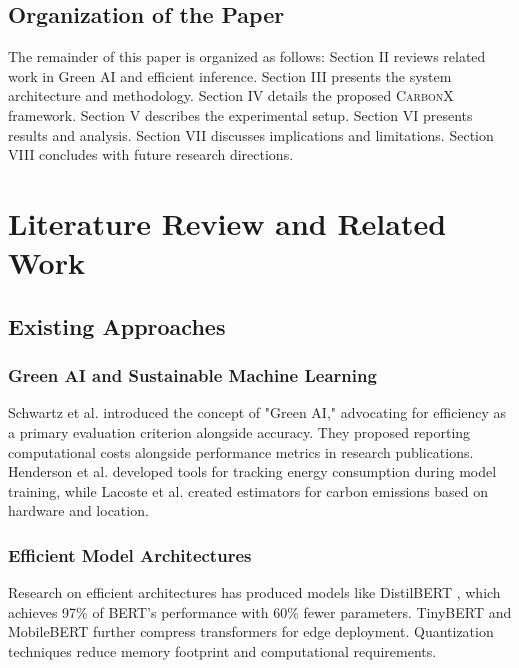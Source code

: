 \documentclass[conference]{IEEEtran}
\newcommand{\carbonx}{\textsc{CarbonX}}
\begin{document}
\subsection{Organization of the Paper}

The remainder of this paper is organized as follows: Section II reviews related work in Green AI and efficient inference. Section III presents the system architecture and methodology. Section IV details the proposed \carbonx{} framework. Section V describes the experimental setup. Section VI presents results and analysis. Section VII discusses implications and limitations. Section VIII concludes with future research directions.

\section{Literature Review and Related Work}

\subsection{Existing Approaches}

\subsubsection{Green AI and Sustainable Machine Learning}

Schwartz et al. \cite{schwartz2020green} introduced the concept of "Green AI," advocating for efficiency as a primary evaluation criterion alongside accuracy. They proposed reporting computational costs alongside performance metrics in research publications. Henderson et al. \cite{henderson2020towards} developed tools for tracking energy consumption during model training, while Lacoste et al. \cite{lacoste2019quantifying} created estimators for carbon emissions based on hardware and location.

\subsubsection{Efficient Model Architectures}

Research on efficient architectures has produced models like DistilBERT \cite{sanh2019distilbert}, which achieves 97\% of BERT's performance with 60\% fewer parameters. TinyBERT \cite{jiao2020tinybert} and MobileBERT \cite{sun2020mobilebert} further compress transformers for edge deployment. Quantization techniques \cite{dettmers2022llmint8} reduce memory footprint and computational requirements.
\end{document}

